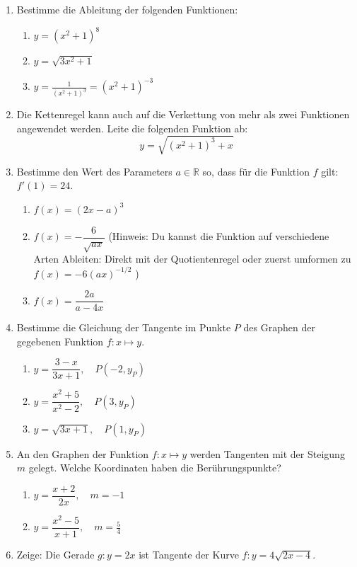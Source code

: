 \clearpage
\begin{ueb}
	{}{}
	\begin{enumerate}
		\item Bestimme die Ableitung der folgenden Funktionen:
		      \begin{enumerate}
			      \item $y = (x^2+1)^8$
			      \item $y = \sqrt{3x^2+1}$
			      \item $y= \frac{1}{(x^2+1)^3}= (x^2+1)^{-3}$
		      \end{enumerate}
		\item Die Kettenregel kann auch auf die Verkettung von mehr als zwei Funktionen angewendet werden. Leite die folgenden Funktion ab:
		      $$y = \sqrt{(x^2+1)^3+x}$$
		\item Bestimme den Wert des Parameters \( a \in \mathbb{R} \) so, dass für die Funktion \( f \) gilt: \( f'(1) = 24 \).
		      \begin{enumerate}
			      \item \( f(x) = (2x - a)^3 \)
			      \item \( f(x) = -\dfrac{6}{\sqrt{a x}} \) (Hinweis: Du kannst die Funktion auf verschiedene Arten Ableiten: Direkt mit der Quotientenregel oder zuerst umformen zu $f(x) = -6 (ax)^{-1/2}$ )
			      \item \( f(x) = \dfrac{2a}{a - 4x} \)
		      \end{enumerate}


		\item Bestimme die Gleichung der Tangente im Punkte \( P \) des Graphen der gegebenen Funktion \( f\colon x \mapsto y \).
		      \begin{enumerate}
			      \item \( y = \dfrac{3 - x}{3x + 1}, \quad P(-2 , y_P) \)
			      \item \( y = \dfrac{x^2 + 5}{x^2 - 2}, \quad P(3 , y_P) \)
			      \item \( y = \sqrt{3x + 1}, \quad P(1 ,  y_P) \)
		      \end{enumerate}

		\item An den Graphen der Funktion \( f\colon x \mapsto y \) werden Tangenten mit der Steigung \( m \) gelegt. Welche Koordinaten haben die Berührungspunkte?
		      \begin{enumerate}
			      \item \( y = \dfrac{x + 2}{2x}, \quad m = -1 \)
			      \item \( y = \dfrac{x^2 - 5}{x + 1}, \quad m = \frac{5}{4} \)
		      \end{enumerate}

		\item Zeige: Die Gerade \( g\colon y = 2x \) ist Tangente der Kurve \( f\colon y = 4 \sqrt{2x - 4} \).


	\end{enumerate}
\end{ueb}

